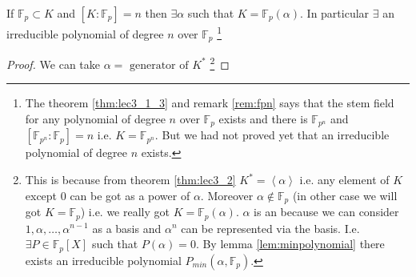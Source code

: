 \begin{corollary}
  If $\mathbb{F}_p \subset K$ and
  $\left[K:\mathbb{F}_p\right] = n$ then $\exists \alpha$ such that
  $K = \mathbb{F}_p\left(\alpha\right)$. In particular $\exists$ an
  irreducible polynomial of degree $n$ over $\mathbb{F}_p$
  \footnote{
    The theorem \ref{thm:lec3_1_3} and remark \ref{rem:fpn} says that
    the stem field for any 
    polynomial of degree $n$ over $\mathbb{F}_p$ exists and there is
    $\mathbb{F}_{p^n}$ and
    $\left[\mathbb{F}_{p^n}:\mathbb{F}_{p}\right] = n$ i.e.
    $K = \mathbb{F}_{p^n}$.
    But we had not proved yet that an
    irreducible polynomial of degree $n$ exists.
  }
  \begin{proof}
    We can take $\alpha = \mbox{ generator of } K^*$
    \footnote{
      This is because from theorem \ref{thm:lec3_2}
      $K^* = \left<\alpha\right>$ i.e. any element of $K$ except $0$
      can be got as a power of $\alpha$. Moreover $\alpha \notin
      \mathbb{F}_p$ (in other case we will got $K = \mathbb{F}_p$)
      i.e. we really got  
      $K = \mathbb{F}_p\left(\alpha\right)$.
      $\alpha$ is an  because we can
      consider
      $1, \alpha, \dots, \alpha^{n-1}$
      as a basis and $\alpha^n$ can be represented via
      the basis. I.e. $\exists P \in \mathbb{F}_p\left[X\right]$ such
      that $P\left(\alpha\right) = 0$.
      By lemma \ref{lem:minpolynomial} 
      there exists an irreducible polynomial
      $P_{min}\left(\alpha, \mathbb{F}_p\right)$.
      }
  \end{proof}
  \label{cor:lec3_1}
\end{corollary}

